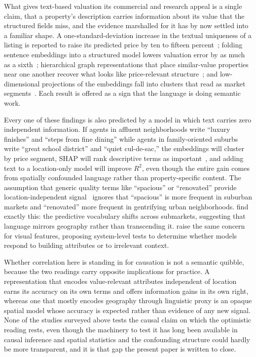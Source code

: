 \documentclass{article}
\begin{document}
What gives text-based valuation its commercial and research appeal is a single claim, that a property's description carries information about its value that the structured fields miss, and the evidence marshalled for it has by now settled into a familiar shape. A one-standard-deviation increase in the textual uniqueness of a listing is reported to raise its predicted price by ten to fifteen percent~\citep{shen2021information}; folding sentence embeddings into a structured model lowers valuation error by as much as a sixth~\citep{baur2023automated}; hierarchical graph representations that place similar-value properties near one another recover what looks like price-relevant structure~\citep{zhang2021mugrep}; and low-dimensional projections of the embeddings fall into clusters that read as market segments~\citep{baur2023automated}. Each result is offered as a sign that the language is doing semantic work.

Every one of these findings is also predicted by a model in which text carries zero independent information. If agents in affluent neighborhoods write ``luxury finishes'' and ``steps from fine dining'' while agents in family-oriented suburbs write ``great school district'' and ``quiet cul-de-sac,'' the embeddings will cluster by price segment, SHAP will rank descriptive terms as important~\citep{lorenz2023interpretable,stang2023location}, and adding text to a location-only model will improve $R^2$, even though the entire gain comes from spatially confounded language rather than property-specific content. The assumption that generic quality terms like ``spacious'' or ``renovated'' provide location-independent signal~\citep{lorenz2023interpretable} ignores that ``spacious'' is more frequent in suburban markets and ``renovated'' more frequent in gentrifying urban neighborhoods. \citet{nowak2021dictionaries} find exactly this: the predictive vocabulary shifts across submarkets, suggesting that language mirrors geography rather than transcending it. \citet{wan2023testing} raise the same concern for visual features, proposing system-level tests to determine whether models respond to building attributes or to irrelevant context.

Whether correlation here is standing in for causation is not a semantic quibble, because the two readings carry opposite implications for practice. A representation that encodes value-relevant attributes independent of location earns its accuracy on its own terms and offers information gains in its own right, whereas one that mostly encodes geography through linguistic proxy is an opaque spatial model whose accuracy is expected rather than evidence of any new signal. None of the studies surveyed above tests the causal claim on which the optimistic reading rests, even though the machinery to test it has long been available in causal inference and spatial statistics and the confounding structure could hardly be more transparent, and it is that gap the present paper is written to close.
\end{document}
